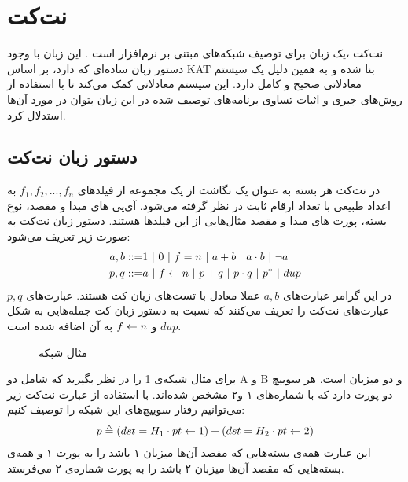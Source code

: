 \section{نت‌کت }
نت‌کت
،یک زبان برای توصیف شبکه‌های مبتنی بر نرم‌افزار است
\cite{netkat}.
این زبان با وجود دستور زبان%
ساده‌ای که دارد، بر اساس
KAT
\cite{kat}
بنا شده و به همین دلیل یک سیستم معادلاتی صحیح و کامل%
دارد.
این سیستم معادلاتی کمک می‌کند تا با استفاده از روش‌های جبری و اثبات تساوی برنامه‌های توصیف شده در این زبان بتوان در مورد آن‌ها استدلال کرد.

\subsection{دستور زبان نت‌کت}
در نت‌کت هر بسته
به عنوان یک نگاشت از یک مجموعه از فیلد‌های
$f_1,f_2,...,f_n$
به اعداد طبیعی با تعداد ارقام ثابت در نظر گرفته می‌شود.
آی‌پی‌%
های مبدا و مقصد، نوع بسته، پورت‌%
های مبدا و مقصد مثال‌هایی از این فیلد‌ها هستند.
دستور زبان نت‌کت به صورت زیر تعریف می‌شود:
\begin{align*}
    a,b ::= & 1 ~|~ 0 ~|~ f = n ~|~ a + b ~|~ a \cdot b ~|~ \neg a  \\
    p,q ::= & a ~|~ f \leftarrow n ~|~ p + q ~|~ p \cdot q ~|~ p^* ~|~ dup
\end{align*}
در این گرامر عبارت‌های
$a,b$
عملا معادل با تست‌های زبان کت%
هستند.
عبارت‌های
$p,q$
عبارت‌های نت‌کت را تعریف می‌کنند که نسبت به دستور زبان کت
جمله‌هایی به شکل
$dup$
و
$f \leftarrow n$
به آن اضافه شده است.
\begin{figure}
    \centering
    \caption{مثال شبکه}
    \label{fig:netkat:ssh}
\end{figure}
برای مثال شبکه‌ی
\ref{fig:netkat:ssh}
را در نظر بگیرید که شامل دو%
A و ‌B
و دو میزبان%
است.
هر سوییچ دو پورت دارد که با شماره‌های ۱ و۲ مشخص شده‌اند.
با استفاده از عبارت نت‌کت زیر می‌توانیم رفتار سوییچ‌های این شبکه را توصیف کنیم:
\begin{align}
    \label{eq:netkat:swp}
    p \triangleq (dst = H_1 \cdot pt \leftarrow 1) +
    (dst = H_2 \cdot pt \leftarrow 2)
\end{align}
این عبارت همه‌ی بسته‌هایی که مقصد آن‌ها میزبان ۱ باشد را به پورت ۱ و همه‌ی بسته‌هایی که مقصد‌ آن‌ها میزبان ۲ باشد را به پورت شماره‌ی ۲ می‌فرستد.

